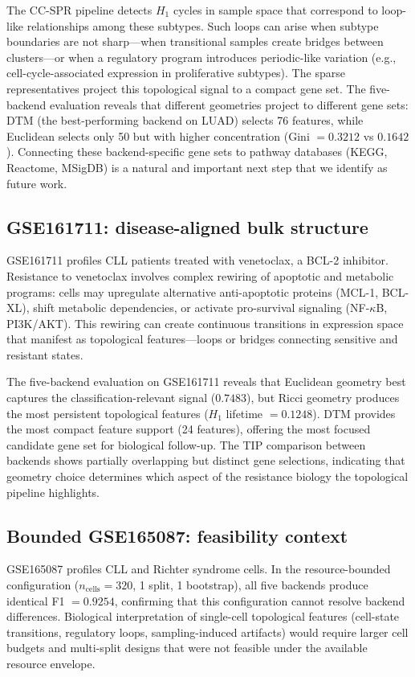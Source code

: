 \documentclass[11pt]{article}
\begin{document}
The CC-SPR pipeline detects $H_1$ cycles in sample space that correspond to loop-like relationships among these subtypes.
Such loops can arise when subtype boundaries are not sharp---when transitional samples create bridges between clusters---or when a regulatory program introduces periodic-like variation (e.g., cell-cycle-associated expression in proliferative subtypes).
The sparse representatives project this topological signal to a compact gene set.
The five-backend evaluation reveals that different geometries project to different gene sets: DTM (the best-performing backend on LUAD) selects 76 features, while Euclidean selects only 50 but with higher concentration (Gini $= 0.3212$ vs $0.1642$).
Connecting these backend-specific gene sets to pathway databases (KEGG, Reactome, MSigDB) is a natural and important next step that we identify as future work.

\subsection{GSE161711: disease-aligned bulk structure}

GSE161711 profiles CLL patients treated with venetoclax, a BCL-2 inhibitor.
Resistance to venetoclax involves complex rewiring of apoptotic and metabolic programs: cells may upregulate alternative anti-apoptotic proteins (MCL-1, BCL-XL), shift metabolic dependencies, or activate pro-survival signaling (NF-$\kappa$B, PI3K/AKT).
This rewiring can create continuous transitions in expression space that manifest as topological features---loops or bridges connecting sensitive and resistant states.

The five-backend evaluation on GSE161711 reveals that Euclidean geometry best captures the classification-relevant signal ($0.7483$), but Ricci geometry produces the most persistent topological features ($H_1$ lifetime $= 0.1248$).
DTM provides the most compact feature support (24 features), offering the most focused candidate gene set for biological follow-up.
The TIP comparison between backends shows partially overlapping but distinct gene selections, indicating that geometry choice determines which aspect of the resistance biology the topological pipeline highlights.

\subsection{Bounded GSE165087: feasibility context}

GSE165087 profiles CLL and Richter syndrome cells.
In the resource-bounded configuration ($n_{\text{cells}} = 320$, 1 split, 1 bootstrap), all five backends produce identical F1 $= 0.9254$, confirming that this configuration cannot resolve backend differences.
Biological interpretation of single-cell topological features (cell-state transitions, regulatory loops, sampling-induced artifacts) would require larger cell budgets and multi-split designs that were not feasible under the available resource envelope.
\end{document}
